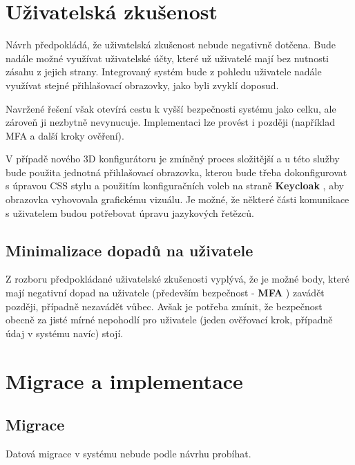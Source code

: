 \documentclass[a4paper,12pt]{article}
\begin{document}
\section{Uživatelská zkušenost}

Návrh předpokládá, že uživatelská zkušenost nebude negativně dotčena. Bude nadále možné využívat uživatelské účty, které už uživatelé mají bez nutnosti zásahu z jejich strany. Integrovaný systém bude z pohledu uživatele nadále využívat stejné přihlašovací obrazovky, jako byli zvyklí doposud.\par

Navržené řešení však otevírá cestu k vyšší bezpečnosti systému jako celku, ale zároveň ji nezbytně nevynucuje. Implementaci lze provést i později (například MFA a další kroky ověření).\par

V případě nového 3D konfigurátoru je zmíněný proces složitější a u této služby bude použita jednotná přihlašovací obrazovka, kterou bude třeba dokonfigurovat s úpravou CSS stylu a použitím konfiguračních voleb na straně \textbf{Keycloak}
, aby obrazovka vyhovovala grafickému vizuálu. Je možné, že některé části komunikace s uživatelem budou potřebovat úpravu jazykových řetězců.\par

\subsection{Minimalizace dopadů na uživatele}

Z rozboru předpokládané uživatelské zkušenosti vyplývá, že je možné body, které mají negativní dopad na uživatele (především bezpečnost - \textbf{MFA}
) zavádět později, případně nezavádět vůbec. Avšak je potřeba zmínit, že bezpečnost obecně za jisté mírné nepohodlí pro uživatele (jeden ověřovací krok, případně údaj v systému navíc) stojí.\par

\section{Migrace a implementace}

\subsection{Migrace}

Datová migrace v systému nebude podle návrhu probíhat.\par
\end{document}

